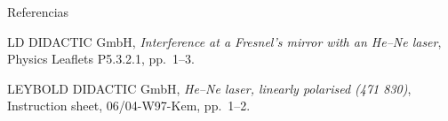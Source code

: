 \documentclass{a0poster}
\newlength{\colw}
\begin{document}
\begin{minipage}[t]{\colw}
\begin{card}{Referencias}
\normalsize
\begin{enumerate}[label={[\arabic*]}, leftmargin=*, labelsep=1ex, itemsep=1ex]
\item LD DIDACTIC GmbH, \emph{Interference at a Fresnel's mirror with an He--Ne laser}, Physics Leaflets P5.3.2.1, pp.~1--3.
\item LEYBOLD DIDACTIC GmbH, \emph{He--Ne laser, linearly polarised (471 830)}, Instruction sheet, 06/04-W97-Kem, pp.~1--2.
\end{enumerate}
\end{card}

\end{minipage}
\end{document}
